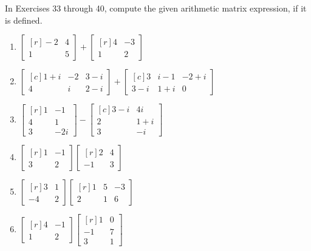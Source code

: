 \documentclass[10pt,letterpaper]{article}
\begin{document}
  In Exercises 33 through 40, compute the given arithmetic matrix expression, if it is defined.
  \begin{enumerate}[resume]
    \item $\begin{bmatrix*}[r] -2 & 4 \\ 1 & 5  \end{bmatrix*} + \begin{bmatrix*}[r] 4 & -3 \\ 1 & 2  \end{bmatrix*}$
    \item $\begin{bmatrix*}[c] 1+i & -2 & 3-i \\ 4 & i & 2-i  \end{bmatrix*} + \begin{bmatrix*}[c] 3 & i-1 & -2+i \\ 3-i & 1+i & 0  \end{bmatrix*}$
    \item $\begin{bmatrix*}[r] 1 & -1 \\ 4 & 1 \\ 3 & -2i \end{bmatrix*} - \begin{bmatrix*}[c] 3-i & 4i \\ 2 & 1+i \\ 3 & -i \end{bmatrix*}$
    \item $\begin{bmatrix*}[r] 1 & -1 \\ 3 & 2  \end{bmatrix*} \begin{bmatrix*}[r] 2 & 4 \\ -1 & 3  \end{bmatrix*}$
    \item $\begin{bmatrix*}[r] 3 & 1 \\ -4 & 2  \end{bmatrix*} \begin{bmatrix*}[r] 1 & 5 & -3 \\ 2 & 1 & 6  \end{bmatrix*}$
    \item $\begin{bmatrix*}[r] 4 & -1 \\ 1 & 2  \end{bmatrix*} \begin{bmatrix*}[r] 1 & 0 \\ -1 & 7 \\ 3 & 1 \end{bmatrix*}$

\end{enumerate}
\end{document}
